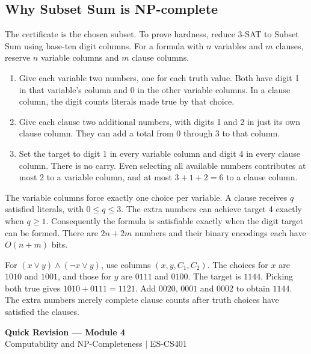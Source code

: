 \documentclass[12pt,a4paper]{article}
\begin{document}
\subsection{Why Subset Sum is NP-complete}
The certificate is the chosen subset. To prove hardness, reduce 3-SAT to Subset Sum using base-ten digit columns. For a formula with $n$ variables and $m$ clauses, reserve $n$ variable columns and $m$ clause columns.
\begin{enumerate}[leftmargin=*, itemsep=3pt]
  \item Give each variable two numbers, one for each truth value. Both have digit 1 in that variable's column and 0 in the other variable columns. In a clause column, the digit counts literals made true by that choice.
  \item Give each clause two additional numbers, with digits 1 and 2 in just its own clause column. They can add a total from 0 through 3 to that column.
  \item Set the target to digit 1 in every variable column and digit 4 in every clause column. There is no carry. Even selecting all available numbers contributes at most 2 to a variable column, and at most $3+1+2=6$ to a clause column.
\end{enumerate}
The variable columns force exactly one choice per variable. A clause receives $q$ satisfied literals, with $0\le q\le3$. The extra numbers can achieve target 4 exactly when $q\ge1$. Consequently the formula is satisfiable exactly when the digit target can be formed. There are $2n+2m$ numbers and their binary encodings each have $O(n+m)$ bits.
\begin{tcolorbox}[examplebox, title={Digit reduction for two variables and two clauses}]
For $(x\lor y)\land(\neg x\lor y)$, use columns $(x,y,C_1,C_2)$. The choices for $x$ are $1010$ and $1001$, and those for $y$ are $0111$ and $0100$. The target is $1144$. Picking both true gives $1010+0111=1121$. Add $0020$, $0001$ and $0002$ to obtain $1144$. The extra numbers merely complete clause counts after truth choices have satisfied the clauses.
\end{tcolorbox}

\newpage
\begin{center}
  {\large\bfseries\color{myred} Quick Revision --- Module 4}\\[3pt]
  {\small\color{mydark} Computability and NP-Completeness $|$ ES-CS401}
\end{center}
\noindent{\color{myred}\rule{\linewidth}{1.2pt}}\par\vspace{4pt}
\end{document}
